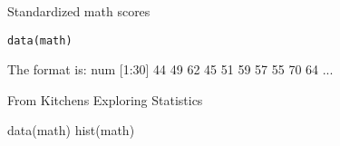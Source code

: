 \begin{Description}\relax
Standardized math scores
\end{Description}
\begin{Usage}
\begin{verbatim}data(math)\end{verbatim}
\end{Usage}
\begin{Format}\relax
The format is:
num [1:30] 44 49 62 45 51 59 57 55 70 64 ...
\end{Format}
\begin{Source}\relax
From Kitchens Exploring Statistics
\end{Source}
\begin{Examples}
\begin{ExampleCode}
data(math)
hist(math)
\end{ExampleCode}
\end{Examples}

